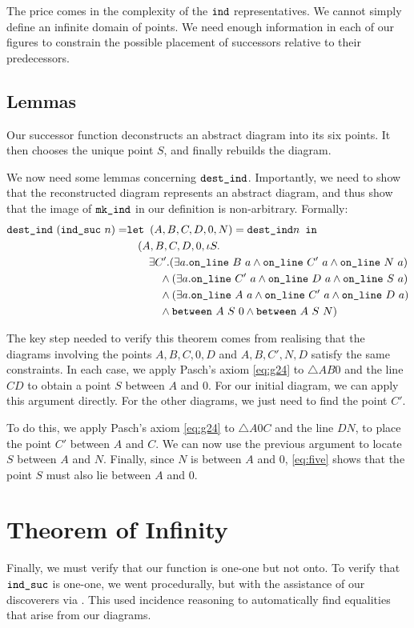 The price comes in the complexity of the $\texttt{ind}$ representatives. We cannot simply define an infinite domain of points. We need enough information in each of our figures to constrain the possible placement of successors relative to their predecessors.

\subsection{Lemmas}
Our successor function deconstructs an abstract diagram into its six points. It then chooses the unique point $S$, and finally rebuilds the diagram. 

We now need some lemmas concerning $\texttt{dest\_ind}$. Importantly, we need to show that the reconstructed diagram represents an abstract diagram, and thus show that the image of $\texttt{mk\_ind}$ in our definition is non-arbitrary. Formally:
\begin{align*}
\texttt{dest\_ind}\ (\texttt{ind\_suc}\ n) = & \texttt{let } (A,B,C,D,0,N) = \texttt{dest\_ind} n \texttt{ in}\\
&\quad (A,B,C,D,0,\iota S.\\
&\quad\quad \exists C'. (\exists a. \texttt{on\_line}\ B\ a \wedge \texttt{on\_line}\ C'\ a \wedge \texttt{on\_line}\ N\ a)\\
&\qquad\quad \wedge (\exists a. \texttt{on\_line}\ C'\ a \wedge \texttt{on\_line}\ D\ a \wedge \texttt{on\_line}\ S\ a)\\
&\qquad\quad \wedge (\exists a. \texttt{on\_line}\ A\ a \wedge \texttt{on\_line}\ C'\ a \wedge \texttt{on\_line}\ D\ a)\\
&\qquad\quad \wedge \texttt{between}\ A\ S\ 0 \wedge \texttt{between}\ A\ S\ N)
\end{align*} 

The key step needed to verify this theorem comes from realising that the diagrams involving the points $A,B,C,0,D$ and $A,B,C',N,D$ satisfy the same constraints. In each case, we apply Pasch's axiom \eqref{eq:g24} to $\triangle AB0$ and the line $CD$ to obtain a point $S$ between $A$ and $0$. For our initial diagram, we can apply this argument directly. For the other diagrams, we just need to find the point $C'$.

To do this, we apply Pasch's axiom \eqref{eq:g24} to $\triangle A0C$ and the line $DN$, to place the point $C'$ between $A$ and $C$. We can now use the previous argument to locate $S$ between $A$ and $N$. Finally, since $N$ is between $A$ and $0$, \ref{eq:five} shows that the point $S$ must also lie between $A$ and $0$. 

\section{Theorem of Infinity}
Finally, we must verify that our function is one-one but not onto. To verify that $\texttt{ind\_suc}$ is one-one, we went procedurally, but with the assistance of our discoverers via . This used incidence reasoning to automatically find equalities that arise from our diagrams. 

